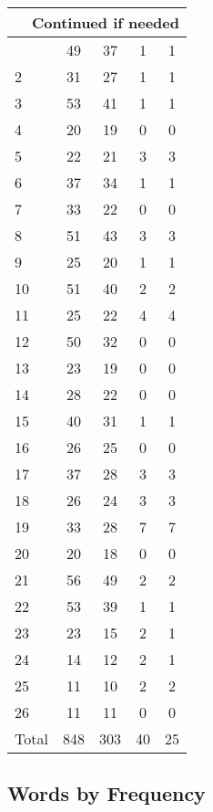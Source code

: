 \begin{center}
\begin{longtable}{l|c|c|c|c}
\hline \multicolumn{5}{|r|}{{Continued if needed}} \\ \hline
\endfoot 
1 & 49 & 37 & 1 & 1\\ \hline
2 & 31 & 27 & 1 & 1\\ \hline
3 & 53 & 41 & 1 & 1\\ \hline
4 & 20 & 19 & 0 & 0\\ \hline
5 & 22 & 21 & 3 & 3\\ \hline
6 & 37 & 34 & 1 & 1\\ \hline
7 & 33 & 22 & 0 & 0\\ \hline
8 & 51 & 43 & 3 & 3\\ \hline
9 & 25 & 20 & 1 & 1\\ \hline
10 & 51 & 40 & 2 & 2\\ \hline
11 & 25 & 22 & 4 & 4\\ \hline
12 & 50 & 32 & 0 & 0\\ \hline
13 & 23 & 19 & 0 & 0\\ \hline
14 & 28 & 22 & 0 & 0\\ \hline
15 & 40 & 31 & 1 & 1\\ \hline
16 & 26 & 25 & 0 & 0\\ \hline
17 & 37 & 28 & 3 & 3\\ \hline
18 & 26 & 24 & 3 & 3\\ \hline
19 & 33 & 28 & 7 & 7\\ \hline
20 & 20 & 18 & 0 & 0\\ \hline
21 & 56 & 49 & 2 & 2\\ \hline
22 & 53 & 39 & 1 & 1\\ \hline
23 & 23 & 15 & 2 & 1\\ \hline
24 & 14 & 12 & 2 & 1\\ \hline
25 & 11 & 10 & 2 & 2\\ \hline
26 & 11 & 11 & 0 & 0\\ \hline
\hline \hline
Total & 848 & 303 & 40 & 25



\end{longtable}
\end{center}

 
\subsection{Words by Frequency}

